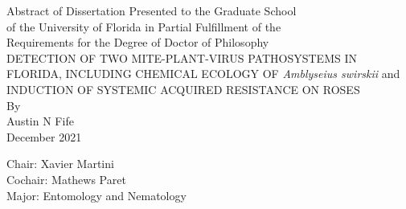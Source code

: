 \documentclass{ufdissertation}[overrideChapters] %
\begin{document}
 \realSingleSpace
  \tableofcontents %



  \listoftables  %



  \listoffigures %



\newpage                         %
    \label{abstract}
        \begin{center}\realSingleSpace
            Abstract of Dissertation Presented to the Graduate School \\
            of the University of Florida in Partial Fulfillment of the \\
            Requirements for the Degree of Doctor of Philosophy\\[\baselineskip]
            {DETECTION OF TWO MITE-PLANT-VIRUS PATHOSYSTEMS IN FLORIDA, INCLUDING CHEMICAL ECOLOGY OF \emph{Amblyseius swirskii} and INDUCTION OF SYSTEMIC ACQUIRED RESISTANCE ON ROSES}\\[\baselineskip] %
            By\\[\baselineskip]
            {Austin N Fife} \\[\baselineskip]
            {December} {2021}\\[\baselineskip]
        \end{center}
    \realSingleSpace\vspace*{-\baselineskip}
            \hfill \break
                \noindent Chair: {Xavier Martini} \\    %
                                \noindent Cochair: {Mathews Paret} \\%
                            \noindent Major: {Entomology and Nematology} \\
\end{document}
